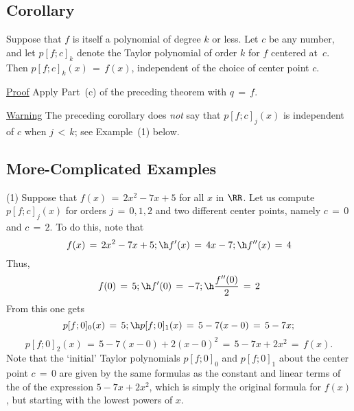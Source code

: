 {\V

            \subsection{\small{\bf Corollary}}
            \label{CorE60.50}

        Suppose that $f$ is itself a polynomial of degree $k$ or less.
    Let $c$ be any number, and let $p[f;c]_{k}$ denote the Taylor polynomial of order $k$ for $f$ centered at~$c$.
    Then $p[f;c]_{k}(x) \,=\, f(x)$, independent of the choice of center point $c$.

\V

    \underline{Proof} Apply Part~(c) of the preceding theorem with $q \,=\, f$.

\V

        \underline{Warning} The preceding corollary does {\em not} say that $p[f;c]_{j}(x)$ is independent of $c$ when $j\,<\,k$; see Example~(1) below.

\VV


            \subsection{\small{\bf More-Complicated Examples}}
            \label{ExampE60.60}

\hspace*{\parindent} 
        (1) Suppose that $f(x) \,=\, 2x^{2}-7x+5$ for all $x$ in ${\RR}$.
    Let us compute $p[f;c]_{j}(x)$ for orders $j \,=\, 0, 1, 2$ and two different center points, namely $c \,=\, 0$ and $c \,=\, 2$.
    To do this, note that
        \begin{displaymath}
        f(x) \,=\, 2x^{2}-7x+5; \h f'(x) \,=\, 4x-7; \h f''(x) \,=\, 4
        \end{displaymath}
    Thus,
        \begin{displaymath}
        f(0) \,=\, 5; \h f'(0) \,=\, -7; \h \frac{f''(0)}{2} \,=\, 2
        \end{displaymath}
    From this one gets
        \begin{displaymath}
        p[f;0]_{0}(x) \,=\, 5; \h p[f;0]_{1}(x) \,=\, 5 -7(x-0) \,=\, 5-7x;
        \end{displaymath}
        \begin{displaymath}
     p[f;0]_{2}(x) \,=\, 5 -7(x-0) + 2(x-0)^{2} \,=\, 5-7x+2x^{2} \,=\, f(x).
        \end{displaymath}
    Note that the `initial' Taylor polynomials $p[f;0]_{0}$ and $p[f;0]_{1}$ about the center point $c \,=\, 0$
    are given by the same formulas as the constant and linear terms of the of the expression $5-7x+2x^{2}$,
    which is simply the original formula for $f(x)$, but starting with the lowest powers of $x$.

}
